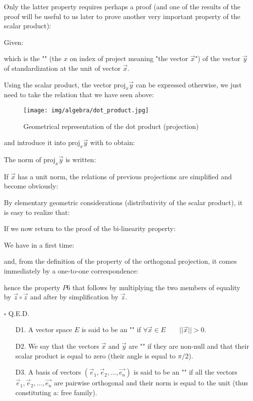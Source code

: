 	Only the latter property requires perhaps a proof (and one of the results of the proof  will be useful to us later to prove another very important property of the scalar product):
	\begin{dem}
	Given:
	
	which is the "" (the $x$ on index of $\text{project}$ meaning "the vector $\vec{x}$") of the vector $\vec{y}$ of standardization at the unit of vector $\vec{x}$.
	
	Using the scalar product, the vector $\text{proj}_x\vec{y}$ can be expressed otherwise, we just need to take the relation that we have seen above:
	\begin{figure}[H]
		\centering
		\texttt{[image: img/algebra/dot\_product.jpg]}
		\caption{Geometrical representation of the dot product (projection)}
	\end{figure}
	
	and introduce it into $\text{proj}_x\vec{y}$ with to obtain:
	
	The norm of $\text{proj}_x\vec{y}$ is written:
	
	If $\vec{x}$ has a unit norm, the relations of previous projections are simplified and become obviously:
	
	By elementary geometric considerations (distributivity of the scalar product), it is easy to realize that:
	
	If we now return to the proof of the bi-linearity property:
	
	We have in a first time:
	
	and, from the definition of the property of the orthogonal projection, it comes immediately by a one-to-one correspondence:
	
	hence the property $P6$ that follows by multiplying the two members of equality by $\vec{z}\circ\vec{z}$ and after by simplification by $\vec{z}$.
	\begin{flushright}
		$\square$  Q.E.D.
	\end{flushright}
	\end{dem}
	\begin{enumerate}
		\item[D1.] A vector space $E$ is said to be an "" if $\forall \vec{x} \in E \qquad ||\vec{x}||>0$.
		
		\item[D2.] We say that the vectors $\vec{x}$ and $\vec{y}$ are "" if they are non-null and that their scalar product is equal to zero (their angle is equal to $\pi/2$).
		
		\item[D3.] A basis of vectors $(\vec{e}_1,\vec{e}_2,...,\vec{e_n})$ is said to be an "" if all the vectors $\vec{e}_1,\vec{e}_2,...,\vec{e_n}$ are pairwise orthogonal and their norm is equal to the unit (thus constituting a: free family).
	\end{enumerate}
